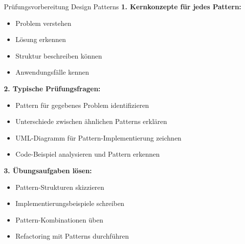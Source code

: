 \begin{KR}{Prüfungsvorbereitung Design Patterns}
\textbf{1. Kernkonzepte für jedes Pattern:}
\begin{itemize}
   \item Problem verstehen
   \item Lösung erkennen
   \item Struktur beschreiben können
   \item Anwendungsfälle kennen
\end{itemize}

\textbf{2. Typische Prüfungsfragen:}
\begin{itemize}
   \item Pattern für gegebenes Problem identifizieren
   \item Unterschiede zwischen ähnlichen Patterns erklären
   \item UML-Diagramm für Pattern-Implementierung zeichnen
   \item Code-Beispiel analysieren und Pattern erkennen
\end{itemize}

\textbf{3. Übungsaufgaben lösen:}
\begin{itemize}
   \item Pattern-Strukturen skizzieren
   \item Implementierungsbeispiele schreiben
   \item Pattern-Kombinationen üben
   \item Refactoring mit Patterns durchführen
\end{itemize}
\end{KR}

